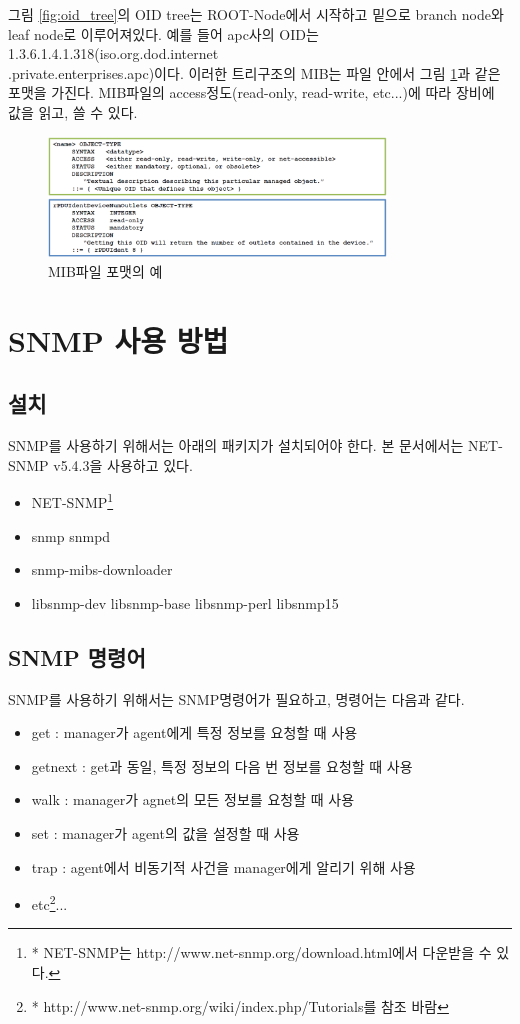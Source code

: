 \documentclass[11pt
  , a4paper
  , article
  , oneside
]{memoir}
\begin{document}
그림 \ref{fig:oid_tree}의 OID tree는 ROOT-Node에서 시작하고 밑으로 branch node와 leaf node로 이루어져있다. 예를 들어 apc사의 OID는 1.3.6.1.4.1.318(iso.org.dod.internet\\.private.enterprises.apc)이다. 이러한 트리구조의 MIB는 파일 안에서 그림 \ref{fig:ex_mib}과 같은 포맷을 가진다. MIB파일의 access정도(read-only, read-write, etc...)에 따라 장비에 값을 읽고, 쓸 수 있다.

\begin{figure}[h!]
  \centering
  \includegraphics[width=0.8\textwidth]{./images/ex_mib.eps}
  \caption{MIB파일 포맷의 예}
  \label{fig:ex_mib}   
\end{figure}

\chapter{SNMP 사용 방법}
\section{설치}
SNMP를 사용하기 위해서는 아래의 패키지가 설치되어야 한다. 본 문서에서는 NET-SNMP\citep{net_snmp} v5.4.3을 사용하고 있다.
\begin{itemize}
\item NET-SNMP\footnote{* NET-SNMP는 http://www.net-snmp.org/download.html에서 다운받을 수 있다.}
\item snmp snmpd
\item snmp-mibs-downloader
\item libsnmp-dev libsnmp-base libsnmp-perl libsnmp15 
\end{itemize}


\section{SNMP 명령어}

SNMP를 사용하기 위해서는 SNMP명령어\citep{snmp_command}가 필요하고, 명령어는 다음과 같다.
\begin{itemize}
\item get : manager가 agent에게 특정 정보를 요청할 때 사용
\item getnext : get과 동일, 특정 정보의 다음 번 정보를 요청할 때 사용
\item walk : manager가 agnet의 모든 정보를 요청할 때 사용
\item set : manager가 agent의 값을 설정할 때 사용
\item trap : agent에서 비동기적 사건을 manager에게 알리기 위해 사용
\item etc\footnote{* http://www.net-snmp.org/wiki/index.php/Tutorials를 참조 바람}...
\end{itemize}
\end{document}
